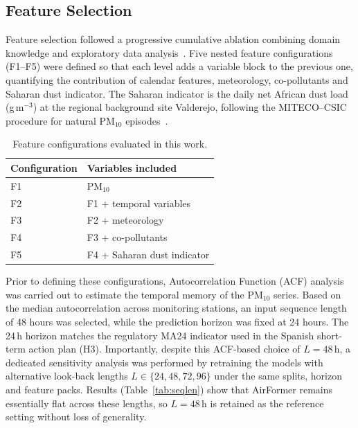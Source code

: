 \documentclass[11pt]{article}
\begin{document}
\subsection{Feature Selection}
Feature selection followed a progressive cumulative ablation combining domain knowledge and exploratory data analysis~\cite{Zhang2026X2AQFormer}. Five nested feature configurations (F1--F5) were defined so that each level adds a variable block to the previous one, quantifying the contribution of calendar features, meteorology, co-pollutants and Saharan dust indicator. The Saharan indicator is the daily net African dust load (\textmu g\,m$^{-3}$) at the regional background site Valderejo, following the MITECO--CSIC procedure for natural PM$_{10}$ episodes~\cite{MITECO2013NaturalPM}.

\begin{table}[H]
\centering
\caption{Feature configurations evaluated in this work.}
\label{tab:features}
\begin{tabular}{ll}
\toprule
Configuration & Variables included\\
\midrule
F1 & PM$_{10}$\\
F2 & F1 + temporal variables\\
F3 & F2 + meteorology\\
F4 & F3 + co-pollutants\\
F5 & F4 + Saharan dust indicator\\
\bottomrule
\end{tabular}
\end{table}

Prior to defining these configurations, Autocorrelation Function (ACF) analysis was carried out to estimate the temporal memory of the PM$_{10}$ series. Based on the median autocorrelation across monitoring stations, an input sequence length of 48 hours was selected, while the prediction horizon was fixed at 24 hours. The 24\,h horizon matches the regulatory MA24 indicator used in the Spanish short-term action plan (H3). Importantly, despite this ACF-based choice of $L{=}48$\,h, a dedicated sensitivity analysis was performed by retraining the models with alternative look-back lengths $L\in\{24,48,72,96\}$ under the same splits, horizon and feature packs. Results (Table~\ref{tab:seqlen}) show that AirFormer remains essentially flat across these lengths, so $L{=}48$\,h is retained as the reference setting without loss of generality.
\end{document}
